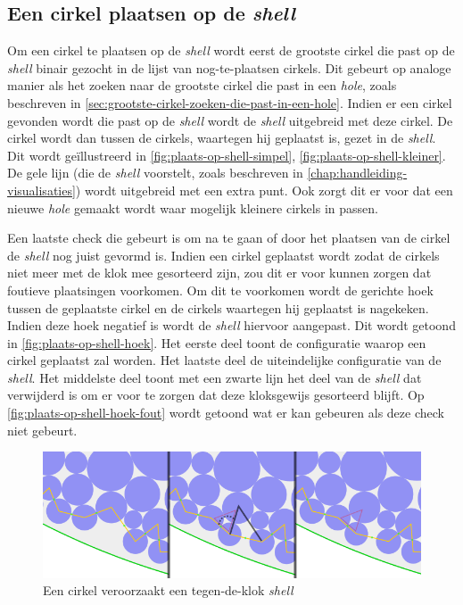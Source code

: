 \documentclass[12pt,a4paper,oneside]{book}
\begin{document}
{\subsection{Een cirkel plaatsen op de \textit{shell}} \label{sec:een-cirkel-plaatsen-op-de-shell}

Om een cirkel te plaatsen op de \textit{shell} wordt eerst de grootste cirkel die past op de \textit{shell} binair gezocht in de lijst van nog-te-plaatsen cirkels.
Dit gebeurt op analoge manier als het zoeken naar de grootste cirkel die past in een \textit{hole}, zoals beschreven in \autoref{sec:grootste-cirkel-zoeken-die-past-in-een-hole}.
Indien er een cirkel gevonden wordt die past op de \textit{shell} wordt de \textit{shell} uitgebreid met deze cirkel.
De cirkel wordt dan tussen de cirkels, waartegen hij geplaatst is, gezet in de \textit{shell}.
Dit wordt geïllustreerd in \autoref{fig:plaats-op-shell-simpel}, \autoref{fig:plaats-op-shell-kleiner}.
De gele lijn (die de \textit{shell} voorstelt, zoals beschreven in \autoref{chap:handleiding-visualisaties}) wordt uitgebreid met een extra punt.
Ook zorgt dit er voor dat een nieuwe \textit{hole} gemaakt wordt waar mogelijk kleinere cirkels in passen.

Een laatste check die gebeurt is om na te gaan of door het plaatsen van de cirkel de \textit{shell} nog juist gevormd is.
Indien een cirkel geplaatst wordt zodat de cirkels niet meer met de klok mee gesorteerd zijn, zou dit er voor kunnen zorgen dat foutieve plaatsingen voorkomen.
Om dit te voorkomen wordt de gerichte hoek tussen de geplaatste cirkel en de cirkels waartegen hij geplaatst is nagekeken.
Indien deze hoek negatief is wordt de \textit{shell} hiervoor aangepast.
Dit wordt getoond in \autoref{fig:plaats-op-shell-hoek}.
Het eerste deel toont de configuratie waarop een cirkel geplaatst zal worden.
Het laatste deel de uiteindelijke configuratie van de \textit{shell}.
Het middelste deel toont met een zwarte lijn het deel van de \textit{shell} dat verwijderd is om er voor te zorgen dat deze kloksgewijs gesorteerd blijft.
Op \autoref{fig:plaats-op-shell-hoek-fout}  wordt getoond wat er kan gebeuren als deze check niet gebeurt.

\begin{figure}
  \centering
  \includegraphics[width=1.0\textwidth]{plaats-op-shell-hoek.png}
  \caption{Een cirkel veroorzaakt een tegen-de-klok \textit{shell}} \label{fig:plaats-op-shell-hoek} 
\end{figure}

}
\end{document}
